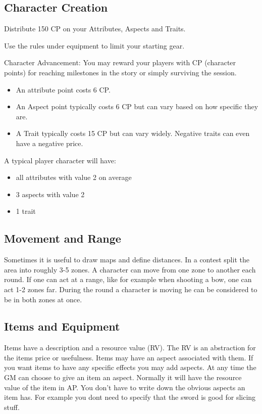 \documentclass[11pt]{article}
\begin{document}
{\subsection{Character Creation}
\label{sec:org810b613}
\begin{short}
Distribute 150 CP on your Attributes, Aspects and Traits.

Use the rules under equipment to limit your starting gear.

Character Advancement:
You may reward your players with CP (character points) for reaching milestones in the story or simply surviving the session.

\begin{itemize}
\item An attribute point costs 6 CP.
\item An Aspect point typically costs 6 CP but can vary based on how specific they are.
\item A Trait typically costs 15 CP but can vary widely. Negative traits can even have a negative price.
\end{itemize}

A typical player character will have:
\begin{itemize}
\item all attributes with value 2 on average
\item 3 aspects with value 2
\item 1 trait
\end{itemize}
\end{short}

\subsection{Movement and Range}
\label{sec:org6e22964}
\begin{short}
Sometimes it is useful to draw maps and define distances. In a contest split the area into roughly 3-5 zones. A character can move from one zone to another each round. If one can act at a range, like for example when shooting a bow, one can act 1-2 zones far. During the round a character is moving he can be considered to be in both zones at once.
\end{short}

\subsection{Items and Equipment}
\label{sec:org8e2c512}
Items have a description and a resource value (RV). The RV is an abstraction for the items price or usefulness. 
Items may have an aspect associated with them. If you want items to have any specific effects you may add aspects. At any time the GM can choose to give an item an aspect. Normally it will have the resource value of the item in AP. You don't have to write down the obvious aspects an item has. For example you dont need to specify that the sword is good for slicing stuff.

}
\end{document}
